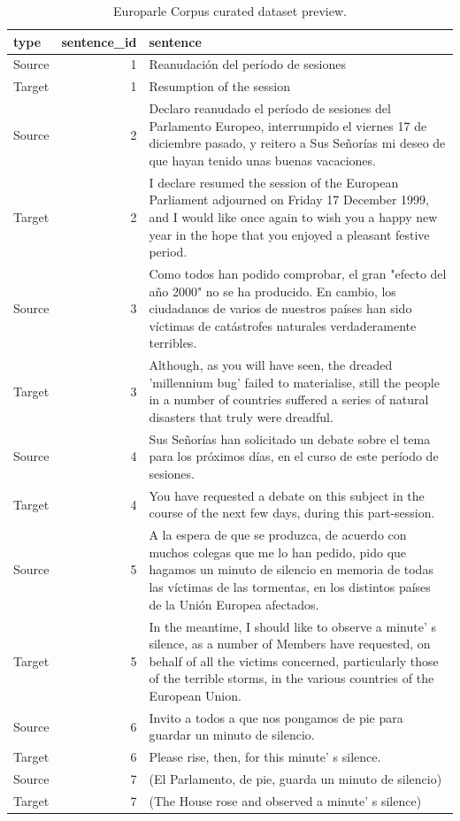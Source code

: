\documentclass[
]{article}
\begin{document}
\begin{table}

\caption{\label{tab:td-europarle-preview-1}Europarle Corpus curated dataset preview.}
\centering
\begin{tabular}[t]{lrl}
\toprule
type & sentence\_id & sentence\\
\midrule
Source & 1 & Reanudación del período de sesiones\\
Target & 1 & Resumption of the session\\
Source & 2 & Declaro reanudado el período de sesiones del Parlamento Europeo, interrumpido el viernes 17 de diciembre pasado, y reitero a Sus Señorías mi deseo de que hayan tenido unas buenas vacaciones.\\
Target & 2 & I declare resumed the session of the European Parliament adjourned on Friday 17 December 1999, and I would like once again to wish you a happy new year in the hope that you enjoyed a pleasant festive period.\\
Source & 3 & Como todos han podido comprobar, el gran "efecto del año 2000" no se ha producido. En cambio, los ciudadanos de varios de nuestros países han sido víctimas de catástrofes naturales verdaderamente terribles.\\
\addlinespace
Target & 3 & Although, as you will have seen, the dreaded 'millennium bug' failed to materialise, still the people in a number of countries suffered a series of natural disasters that truly were dreadful.\\
Source & 4 & Sus Señorías han solicitado un debate sobre el tema para los próximos días, en el curso de este período de sesiones.\\
Target & 4 & You have requested a debate on this subject in the course of the next few days, during this part-session.\\
Source & 5 & A la espera de que se produzca, de acuerdo con muchos colegas que me lo han pedido, pido que hagamos un minuto de silencio en memoria de todas las víctimas de las tormentas, en los distintos países de la Unión Europea afectados.\\
Target & 5 & In the meantime, I should like to observe a minute' s silence, as a number of Members have requested, on behalf of all the victims concerned, particularly those of the terrible storms, in the various countries of the European Union.\\
\addlinespace
Source & 6 & Invito a todos a que nos pongamos de pie para guardar un minuto de silencio.\\
Target & 6 & Please rise, then, for this minute' s silence.\\
Source & 7 & (El Parlamento, de pie, guarda un minuto de silencio)\\
Target & 7 & (The House rose and observed a minute' s silence)\\
\bottomrule
\end{tabular}
\end{table}
\end{document}
